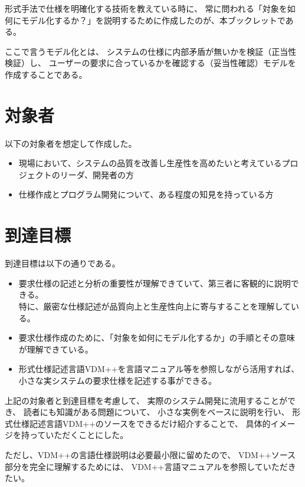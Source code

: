 形式手法で仕様を明確化する技術を教えている時に、
常に問われる「対象を如何にモデル化するか？」を説明するために作成したのが、本ブックレットである。

ここで言うモデル化とは、
システムの仕様に内部矛盾が無いかを検証（正当性検証）し、
ユーザーの要求に合っているかを確認する（妥当性確認）モデルを作成することである。

\section {対象者}
	以下の対象者を想定して作成した。

	\begin{itemize}
	\item 現場において、システムの品質を改善し生産性を高めたいと考えているプロジェクトのリーダ、開発者の方
	\item 仕様作成とプログラム開発について、ある程度の知見を持っている方 
	\end{itemize}

\section {到達目標}

	到達目標は以下の通りである。

	\begin{itemize}
	\item 要求仕様の記述と分析の重要性が理解できていて、第三者に客観的に説明できる。 \\
		特に、厳密な仕様記述が品質向上と生産性向上に寄与することを理解している。
	\item 要求仕様作成のために、「対象を如何にモデル化するか」の手順とその意味が理解できている。
	\item 形式仕様記述言語VDM++を言語マニュアル\cite{Kyushu2016PP}等を参照しながら活用すれば、 \\
		小さな実システムの要求仕様を記述する事ができる。
	\end{itemize}

	上記の対象者と到達目標を考慮して、
	実際のシステム開発に流用することができ、
	読者にも知識がある問題について、
	小さな実例をベースに説明を行い、
	形式仕様記述言語VDM++のソースをできるだけ紹介することで、
	具体的イメージを持っていただくことにした。

	ただし、VDM++の言語仕様説明は必要最小限に留めたので、
	VDM++ソース部分を完全に理解するためには、
	VDM++言語マニュアル\cite{Kyushu2016PP}を参照していただきたい。

